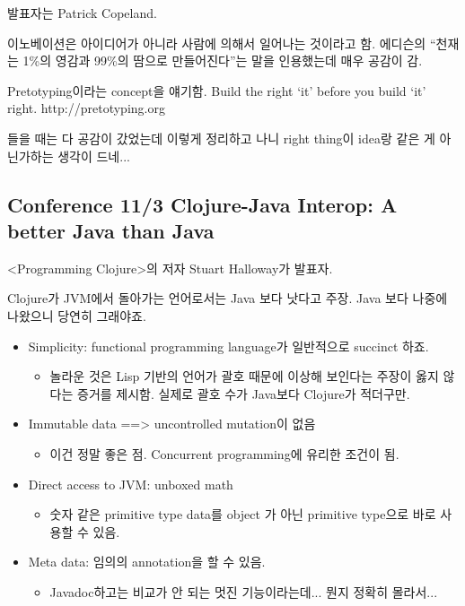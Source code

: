 \documentclass[a4paper]{article}
\begin{document}
발표자는 Patrick Copeland.
 
이노베이션은 아이디어가 아니라 사람에 의해서 일어나는 것이라고 함.
에디슨의 ``천재는 1\%의 영감과 99\%의 땀으로 만들어진다''는 말을
인용했는데 매우 공감이 감.
 
Pretotyping이라는 concept을 얘기함.
Build the right `it' before you build `it' right.
http://pretotyping.org
 
들을 때는 다 공감이 갔었는데 이렇게 정리하고 나니 right thing이 idea랑 같은 게 아닌가하는 생각이 드네...
 
\subsection{Conference 11/3 Clojure-Java Interop: A better Java than Java}
 
<Programming Clojure>의 저자 Stuart Halloway가 발표자.
 
Clojure가 JVM에서 돌아가는 언어로서는 Java 보다 낫다고 주장. Java 보다
나중에 나왔으니 당연히 그래야죠.
 
\begin{itemize}
\item Simplicity: functional programming language가 일반적으로 succinct 하죠.
  \begin{itemize}
  \item 놀라운 것은 Lisp 기반의 언어가 괄호 때문에 이상해 보인다는
    주장이 옳지 않다는 증거를 제시함. 실제로 괄호 수가 Java보다
    Clojure가 적더구만.
  \end{itemize}

\item Immutable data ==> uncontrolled mutation이 없음
  \begin{itemize}
  \item 이건 정말 좋은 점. Concurrent programming에 유리한 조건이 됨.
  \end{itemize}

\item Direct access to JVM: unboxed math
  \begin{itemize}
  \item 숫자 같은 primitive type data를 object 가 아닌 primitive
    type으로 바로 사용할 수 있음.
  \end{itemize}

\item Meta data: 임의의 annotation을 할 수 있음.
  \begin{itemize}
  \item Javadoc하고는 비교가 안 되는 멋진 기능이라는데... 뭔지 정확히
    몰라서...
  \end{itemize}
\end{itemize}
 
\end{document}
